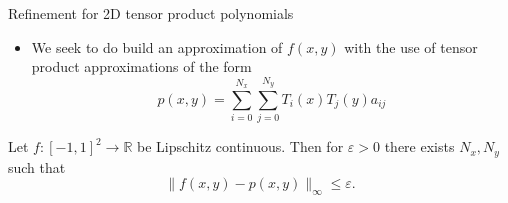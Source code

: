 \documentclass{beamer}
\newcommand{\R}{\mathbb{R}}
\begin{document}
\begin{frame}{Refinement for 2D tensor product polynomials}
\begin{itemize}
\item We seek to do build an approximation of $f(x,y)$ with the use of tensor product approximations of the form $$ p(x,y) = \sum_{i=0}^{N_x} \sum_{j=0}^{N_y} T_i(x)T_j(y) a_{ij}$$
\end{itemize}

\begin{theorem} 
Let $f:[-1,1]^2 \to \R$ be Lipschitz continuous. Then for $\varepsilon>0$ there exists $N_x,N_y$ such that
$$
\|f(x,y)-p(x,y)\|_{\infty} \leq \varepsilon.
$$
 \end{theorem}

\end{frame}

%


%
%
%
%
\end{document}
